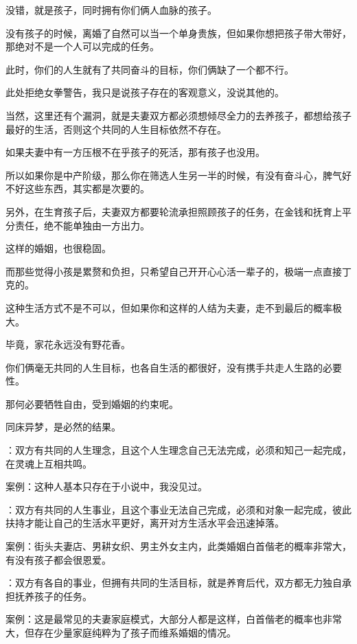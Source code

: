 \documentclass[UTF8,11pt,oneside]{ctexart}
\begin{document}
没错，就是孩子，同时拥有你们俩人血脉的孩子。


没有孩子的时候，离婚了自然可以当一个单身贵族，但如果你想把孩子带大带好，那绝对不是一个人可以完成的任务。

此时，你们的人生就有了共同奋斗的目标，你们俩缺了一个都不行。

此处拒绝女拳警告，我只是说孩子存在的客观意义，没说其他的。

当然，这里还有个漏洞，就是夫妻双方都必须想倾尽全力的去养孩子，都想给孩子最好的生活，否则这个共同的人生目标依然不存在。

如果夫妻中有一方压根不在乎孩子的死活，那有孩子也没用。

所以如果你是中产阶级，那么你在筛选人生另一半的时候，有没有奋斗心，脾气好不好这些东西，其实都是次要的。


另外，在生育孩子后，夫妻双方都要轮流承担照顾孩子的任务，在金钱和抚育上平分责任，绝不能单独由一方出力。

这样的婚姻，也很稳固。

而那些觉得小孩是累赘和负担，只希望自己开开心心活一辈子的，极端一点直接丁克的。

这种生活方式不是不可以，但如果你和这样的人结为夫妻，走不到最后的概率极大。

毕竟，家花永远没有野花香。

你们俩毫无共同的人生目标，也各自生活的都很好，没有携手共走人生路的必要性。

那何必要牺牲自由，受到婚姻的约束呢。

同床异梦，是必然的结果。

：双方有共同的人生理念，且这个人生理念自己无法完成，必须和知己一起完成，在灵魂上互相共鸣。

案例：这种人基本只存在于小说中，我没见过。

：双方有共同的人生事业，且这个事业无法自己完成，必须和对象一起完成，彼此扶持才能让自己的生活水平更好，离开对方生活水平会迅速掉落。

案例：街头夫妻店、男耕女织、男主外女主内，此类婚姻白首偕老的概率非常大，有没有孩子都会很恩爱。

：双方有各自的事业，但拥有共同的生活目标，就是养育后代，双方都无力独自承担抚养孩子的任务。

案例：这是最常见的夫妻家庭模式，大部分人都是这样，白首偕老的概率也非常大，但存在少量家庭纯粹为了孩子而维系婚姻的情况。
\end{document}
